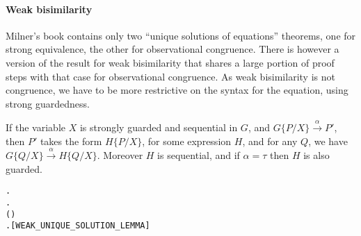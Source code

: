 \paragraph{Weak bisimilarity}
Milner's book \cite{Mil89} contains only two ``unique solutions of
equations'' theorems, one for strong equivalence, the other for
observational congruence.   There is however a
version  of the result for weak bisimilarity that shares a large portion of proof
steps with that case for observational congruence.  
As  weak bisimilarity 
 is not congruence, we have to be more restrictive on the syntax for
 the equation, using strong guardedness.
\begin{lemma}
If the variable $X$ is strongly guarded and sequential in $G$, and
$G\{P/X\}\overset{\alpha}{\rightarrow} P'$, then $P'$ takes the form
$H\{P/X\}$, for some expression $H$, and for any $Q$, we have
$G\{Q/X\}\overset{\alpha}{\rightarrow} H\{Q/X\}$. Moreover $H$ is
sequential, and if $\alpha = \tau$ then $H$ is also guarded.
\begin{alltt}
\HOLTokenTurnstile{}   \HOLSymConst{\HOLTokenConj{}}   \HOLSymConst{\HOLTokenImp{}}
   \HOLSymConst{\HOLTokenForall{}}  .
         \HOLTokenTransBegin{}\HOLTokenTransEnd {} \HOLSymConst{\HOLTokenImp{}}
       \HOLSymConst{\HOLTokenExists{}}.
             \HOLSymConst{\HOLTokenConj{}} ( \HOLSymConst{=} \HOLSymConst{\ensuremath{\tau}} \HOLSymConst{\HOLTokenImp{}}  ) \HOLSymConst{\HOLTokenConj{}}  \HOLSymConst{=}   \HOLSymConst{\HOLTokenConj{}}
           \HOLSymConst{\HOLTokenForall{}}.   \HOLTokenTransBegin{}\HOLTokenTransEnd {} \hfill{[WEAK_UNIQUE_SOLUTION_LEMMA]}
\end{alltt}
\end{lemma}

